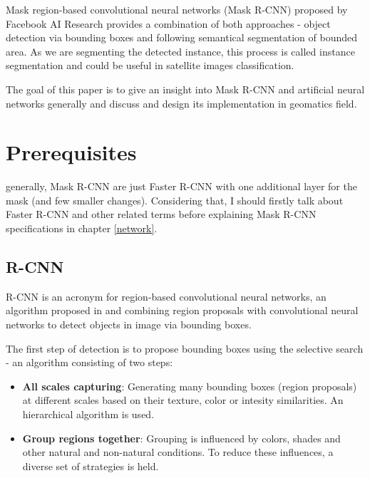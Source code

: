 \documentclass[journal, onecolumn, a4paper]{IEEEtran}
\begin{document}
Mask region-based convolutional neural networks (Mask R-CNN) proposed by 
Facebook AI Research provides a combination of both approaches - object 
detection via bounding boxes and following semantical segmentation of bounded 
area. As we are segmenting the detected instance, this process is called 
instance segmentation and could be useful in satellite images classification. 


The goal of this paper is to give an insight into Mask R-CNN and artificial neural networks generally and discuss and design its implementation in geomatics field. 

\section{Prerequisites}
\label{history}

 generally, Mask R-CNN are just Faster R-CNN \cite{faster-rcnn} with one additional layer for the mask (and few smaller changes). Considering that, I should firstly talk about Faster R-CNN and other related terms before explaining Mask R-CNN specifications in chapter \ref{network}.


\subsection{R-CNN}
\label{subsec:rcnn}

R-CNN is an acronym for region-based convolutional neural networks, an algorithm proposed in \cite{rcnn} and combining region proposals with convolutional neural networks to detect objects in image via bounding boxes.  

The first step of detection is to propose bounding boxes using the selective search \cite{search} - an algorithm consisting of two steps: 
\begin{itemize}
\item \textbf{All scales capturing}: Generating many bounding boxes (region proposals) at different scales based on their texture, color or intesity similarities. An hierarchical algorithm is used. 
\item \textbf{Group regions together}: Grouping is influenced by colors, shades and other natural and non-natural conditions. To reduce these influences, a diverse set of strategies is held. 
\end{itemize}
\end{document}
